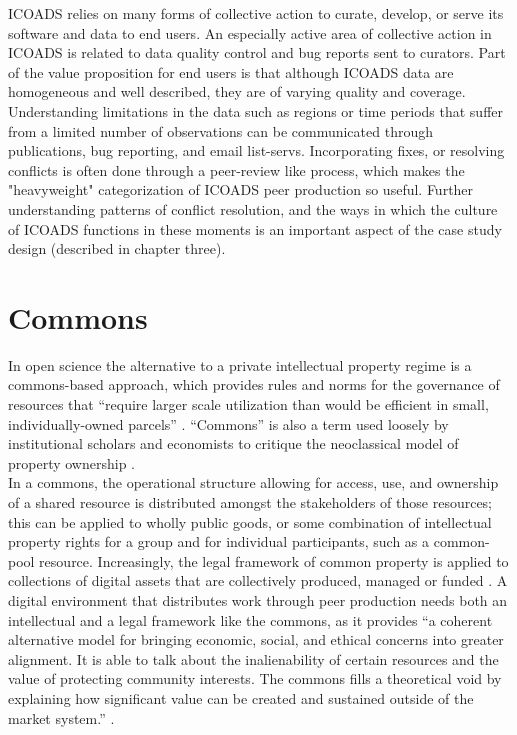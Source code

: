 \documentclass[thesis,tocnosub,noragright,centerchapter,12pt]{uiucecethesis09}
\begin{document}
ICOADS relies on many forms of collective action to curate, develop, or serve its software and data to end users. An especially active area of collective action in ICOADS is related to data quality control and bug reports sent to curators. Part of the value proposition for end users is that although ICOADS data are homogeneous and well described, they are of varying quality and coverage. Understanding limitations in the data such as regions or time periods that suffer from a limited number of observations can be communicated through publications, bug reporting, and email list-servs. Incorporating fixes, or resolving conflicts is often done through a peer-review like process, which makes the "heavyweight" categorization of ICOADS peer production so useful. Further understanding patterns of conflict resolution, and the ways in which the culture of ICOADS functions in these moments is an important aspect of the case study design (described in chapter three). 

\section{Commons}

In open science the alternative to a private intellectual property
regime is a commons-based approach, which provides rules and norms for
the governance of resources that ``require larger scale utilization than
would be efficient in small, individually-owned parcels'' \citep{benkler2011between}. ``Commons'' is also a term used loosely by institutional scholars
and economists to critique the neoclassical model of property ownership
\citep{hess2003ideas}.\\

In a commons, the operational structure allowing for access, use, and
ownership of a shared resource is distributed amongst the stakeholders
of those resources; this can be applied to wholly public goods, or some
combination of intellectual property rights for a group and for individual participants, such as
a common-pool resource. Increasingly, the legal framework of common
property is applied to collections of digital assets that are
collectively produced, managed or funded \citep{hess2007understanding}. A digital environment that distributes work through
peer production needs both an intellectual and a legal framework like
the commons, as it provides ``a coherent alternative model for bringing
economic, social, and ethical concerns into greater alignment. It is
able to talk about the inalienability of certain resources and the value
of protecting community interests. The commons fills a theoretical void
by explaining how significant value can be created and sustained outside
of the market system.'' \citep[p. 27]{bollier2007growth}.\\
\end{document}
